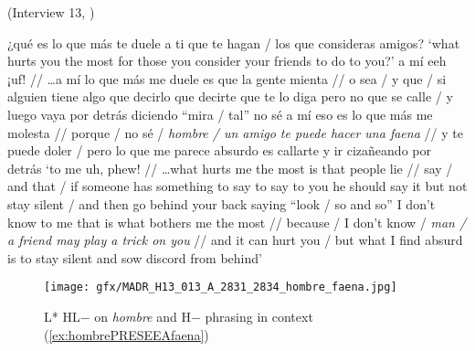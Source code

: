 \begin{exe}
	\ex (Interview 13, \cite{PRESEEA.20142020}) \label{ex:hombrePRESEEAfaena}
	\begin{xlist}[A:]
	  ¿qué es lo que más te duele a ti que te hagan / los que consideras amigos? 
	\glt `what hurts you the most for those you consider your friends to do to you?'
	  a mí eeh ¡uf! // \ldots a mí lo que más me duele es que la gente mienta // o sea / y que / si alguien tiene algo que decirlo que decirte que te lo diga pero no que se calle / y luego vaya por detrás diciendo ``mira / tal'' no sé a mí eso es lo que más me molesta // porque / no sé / \textit{hombre / un amigo te puede hacer una faena} // y te puede doler / pero lo que me parece absurdo es callarte y ir cizañeando por detrás
	\glt `to me uh, phew! // \ldots what hurts me the most is that people lie // say / and that / if someone has something to say to say to you he should say it but not stay silent / and then go behind your back saying ``look / so and so'' I don't know to me that is what bothers me the most // because / I don't know / \textit{man / a friend may play a trick on you} // and it can hurt you / but what I find absurd is to stay silent and sow discord from behind'
	\end{xlist}
\end{exe}

\vfill
\begin{figure}[H]
	\texttt{[image: gfx/MADR\_H13\_013\_A\_2831\_2834\_hombre\_faena.jpg]}
	\caption{L* HL$-$ on \textit{hombre} and H$-$ phrasing in context (\ref{ex:hombrePRESEEAfaena}) \href{https://osf.io/ut5rc/}{\faVolumeUp} \label{fig:hombrePRESEEAfaena}}
\end{figure}
\vfill\pagebreak

